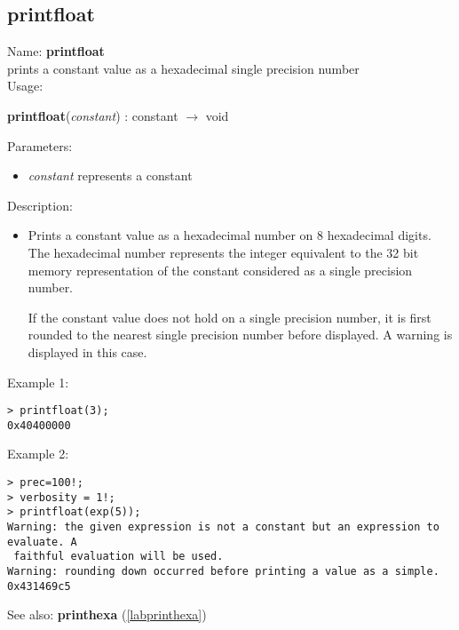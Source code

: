 \subsection{printfloat}
\label{labprintfloat}
\noindent Name: \textbf{printfloat}\\
prints a constant value as a hexadecimal single precision number\\
\noindent Usage: 
\begin{center}
\textbf{printfloat}(\emph{constant}) : \textsf{constant} $\rightarrow$ \textsf{void}
\end{center}
Parameters: 
\begin{itemize}
\item \emph{constant} represents a constant
\end{itemize}
\noindent Description: \begin{itemize}

\item Prints a constant value as a hexadecimal number on 8 hexadecimal
   digits. The hexadecimal number represents the integer equivalent to
   the 32 bit memory representation of the constant considered as a
   single precision number.
    
   If the constant value does not hold on a single precision number, it
   is first rounded to the nearest single precision number before
   displayed. A warning is displayed in this case.
\end{itemize}
\noindent Example 1: 
\begin{center}\begin{minipage}{15cm}\begin{Verbatim}[frame=single]
> printfloat(3);
0x40400000
\end{Verbatim}
\end{minipage}\end{center}
\noindent Example 2: 
\begin{center}\begin{minipage}{15cm}\begin{Verbatim}[frame=single]
> prec=100!;
> verbosity = 1!;
> printfloat(exp(5));
Warning: the given expression is not a constant but an expression to evaluate. A
 faithful evaluation will be used.
Warning: rounding down occurred before printing a value as a simple.
0x431469c5
\end{Verbatim}
\end{minipage}\end{center}
See also: \textbf{printhexa} (\ref{labprinthexa})
